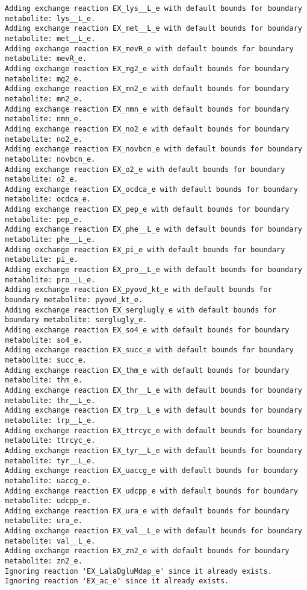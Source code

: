 \documentclass[
  letterpaper,
  DIV=11,
  numbers=noendperiod]{scrartcl}
\begin{document}
\begin{verbatim}
Adding exchange reaction EX_lys__L_e with default bounds for boundary metabolite: lys__L_e.
Adding exchange reaction EX_met__L_e with default bounds for boundary metabolite: met__L_e.
Adding exchange reaction EX_mevR_e with default bounds for boundary metabolite: mevR_e.
Adding exchange reaction EX_mg2_e with default bounds for boundary metabolite: mg2_e.
Adding exchange reaction EX_mn2_e with default bounds for boundary metabolite: mn2_e.
Adding exchange reaction EX_nmn_e with default bounds for boundary metabolite: nmn_e.
Adding exchange reaction EX_no2_e with default bounds for boundary metabolite: no2_e.
Adding exchange reaction EX_novbcn_e with default bounds for boundary metabolite: novbcn_e.
Adding exchange reaction EX_o2_e with default bounds for boundary metabolite: o2_e.
Adding exchange reaction EX_ocdca_e with default bounds for boundary metabolite: ocdca_e.
Adding exchange reaction EX_pep_e with default bounds for boundary metabolite: pep_e.
Adding exchange reaction EX_phe__L_e with default bounds for boundary metabolite: phe__L_e.
Adding exchange reaction EX_pi_e with default bounds for boundary metabolite: pi_e.
Adding exchange reaction EX_pro__L_e with default bounds for boundary metabolite: pro__L_e.
Adding exchange reaction EX_pyovd_kt_e with default bounds for boundary metabolite: pyovd_kt_e.
Adding exchange reaction EX_serglugly_e with default bounds for boundary metabolite: serglugly_e.
Adding exchange reaction EX_so4_e with default bounds for boundary metabolite: so4_e.
Adding exchange reaction EX_succ_e with default bounds for boundary metabolite: succ_e.
Adding exchange reaction EX_thm_e with default bounds for boundary metabolite: thm_e.
Adding exchange reaction EX_thr__L_e with default bounds for boundary metabolite: thr__L_e.
Adding exchange reaction EX_trp__L_e with default bounds for boundary metabolite: trp__L_e.
Adding exchange reaction EX_ttrcyc_e with default bounds for boundary metabolite: ttrcyc_e.
Adding exchange reaction EX_tyr__L_e with default bounds for boundary metabolite: tyr__L_e.
Adding exchange reaction EX_uaccg_e with default bounds for boundary metabolite: uaccg_e.
Adding exchange reaction EX_udcpp_e with default bounds for boundary metabolite: udcpp_e.
Adding exchange reaction EX_ura_e with default bounds for boundary metabolite: ura_e.
Adding exchange reaction EX_val__L_e with default bounds for boundary metabolite: val__L_e.
Adding exchange reaction EX_zn2_e with default bounds for boundary metabolite: zn2_e.
Ignoring reaction 'EX_LalaDgluMdap_e' since it already exists.
Ignoring reaction 'EX_ac_e' since it already exists.

\end{verbatim}
\end{document}
